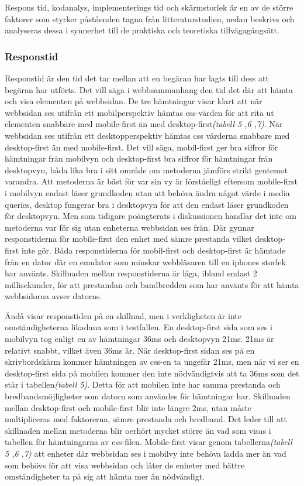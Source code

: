 \documentclass[11pt]{article}
\begin{document}
Respons tid, kodanalys, implementerings tid och skärmstorlek är en av de större faktorer som styrker påståenden tagna från litteraturstudien, nedan beskrivs och analyseras dessa i synnerhet till de praktiska och teoretiska tillvägagångsätt.

\subsubsection{Responstid}
Responstid är den tid det tar mellan att en begäran har lagts till dess att begäran har utförts. Det vill säga i webbsammanhang den tid det där att hämta och visa elementen på webbsidan. De tre hämtningar visar klart att när webbsidan ses utifrån ett mobilperspektiv hämtas css-värden för att rita ut elementen snabbare med mobile-first än med desktop-first\textit{(tabell 5 ,6 ,7)}. När webbsidan ses utifrån ett desktopperspektiv hämtas css värderna snabbare med desktop-first än med mobile-first. Det vill säga, mobil-first ger bra siffror för hämtningar från mobilvyn och desktop-first bra siffror för hämtningar från desktopvyn, båda lika bra i sitt område om metoderna jämförs strikt gentemot varandra. Att metoderna är bäst för var sin vy är förståeligt eftersom mobile-first i mobilvyn endast läser grundkoden utan att behöva ändra något värde i media queries, desktop fungerar bra i desktopvyn för att den endast läser grundkoden för desktopvyn. Men som tidigare poängterats i diskussionen handlar det inte om metoderna var för sig utan enheterna webbsidan ses från. Där gynnar responstiderna för mobile-first den enhet med sämre prestanda vilket desktop-first inte gör. Båda responstiderna för mobil-first och desktop-first är hämtade från en dator där en emulator som minskar webbläsaren till en iphones storlek har använts. Skillnaden mellan responstiderna är låga, ibland endast 2 millisekunder, för att prestandan och bandbredden som har använts för att hämta webbsidorna avser datorns. 

Ändå visar responstiden på en skillnad, men i verkligheten är inte omständigheterna likadana som i testfallen. En desktop-first sida som ses i mobilvyn tog enligt en av hämtningar 36ms och desktopvyn 21ms. 21ms är relativt snabbt, vilket även 36ms är. När desktop-first sidan ses på en skrivbordskärm kommer hämtningen av css-en ta ungefär 21ms, men när vi ser en desktop-first sida på mobilen kommer den inte nödvändigtvis att ta 36ms som det står i tabellen\textit{(tabell 5)}. Detta för att mobilen inte har samma prestanda och bredbandsmöjligheter som datorn som användes för hämtningar har. Skillnaden mellan desktop-first och mobile-first blir inte längre 2ms, utan måste multipliceras med faktorerna, sämre prestanda och bredband. Det leder till att skillnaden mellan metoderna blir oerhört mycket större än vad som visas i tabellen för hämtningarna av css-filen. Mobile-first visar genom tabellerna\textit{(tabell 5 ,6 ,7)} att enheter där webbsidan ses i mobilvy inte behöva ladda mer än vad som behövs för att visa webbsidan och låter de enheter med bättre omständigheter ta på sig att hämta mer än nödvändigt.
\end{document}
